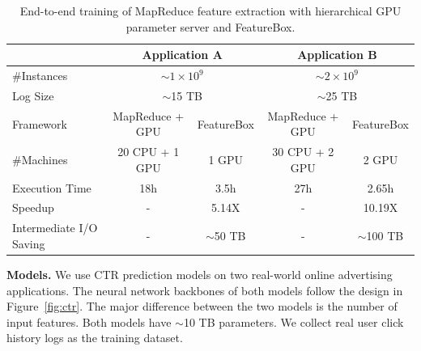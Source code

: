 \documentclass[sigconf]{acmart}
\begin{document}
\begin{table}[htbp]
\caption{End-to-end training of MapReduce feature extraction with hierarchical GPU parameter server and FeatureBox.}\label{tbl:comp}
\normalsize
\centering
\begin{tabular}{l|c|c|c|c}
\toprule
\hline
 & \multicolumn{2}{c|}{Application A} & \multicolumn{2}{c}{Application B} \\
 \hline
\#Instances & \multicolumn{2}{c|}{$\sim 1\times10^9$} & \multicolumn{2}{c}{$\sim 2\times 10^9$} \\
Log Size & \multicolumn{2}{c|}{$\sim$15 TB} & \multicolumn{2}{c}{$\sim$25 TB} \\
\hline
Framework & MapReduce + GPU & \multicolumn{1}{l|}{FeatureBox} & MapReduce + GPU & \multicolumn{1}{l}{FeatureBox} \\
\hline
\#Machines & 20 CPU + 1 GPU & 1 GPU & 30 CPU + 2 GPU & 2 GPU \\
Execution Time & \multicolumn{1}{c|}{18h} & 3.5h & \multicolumn{1}{c|}{27h} & 2.65h \\
Speedup & \multicolumn{1}{c|}{-} & 5.14X & \multicolumn{1}{c|}{-} & 10.19X\\
Intermediate I/O Saving & - & $\sim$50 TB & - & $\sim$100 TB\\
\hline
\bottomrule
\end{tabular}
\end{table}

\textbf{Models.} 
We use CTR prediction models on two real-world online advertising applications. The neural network backbones of both models follow the design in Figure~\ref{fig:ctr}. The major difference between the two models is the number of input features. Both models have $\sim$10 TB parameters. We collect real user click history logs as the training dataset. 
\end{document}
